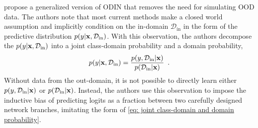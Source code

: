 \textcite{hsu_generalized_2020} propose a generalized version of ODIN that removes the need for simulating OOD data.
The authors note that most current methods make a closed world assumption and implicitly condition on the in-domain $\mathcal{D}_{\text{in}}$ in the form of the predictive distribution $p(y|{\mathbf{x}}, \mathcal{D}_{\text{in}})$. With this observation, the authors decompose the $p(y|{\mathbf{x}}, \mathcal{D}_{\text{in}})$ into a joint class-domain probability and a domain probability,
%
\begin{equation} \label{eq: joint class-domain and domain probability}
    p(y|\xb,\mathcal{D}_{\text{in}}) = \frac{p(y, \mathcal{D}_{\text{in}}|\xb)}{p(\mathcal{D}_{\text{in}}|\xb)} \enspace .
\end{equation}
%
Without data from the out-domain, it is not possible to directly learn either $p(y, \mathcal{D}_{\text{in}}|{\mathbf{x}})$ or $p(\mathcal{D}_{\text{in}}|{\mathbf{x}})$. Instead, the authors use this observation to impose the inductive bias of predicting logits as a fraction between two carefully designed network branches, imitating the form of \cref{eq: joint class-domain and domain probability}. 

